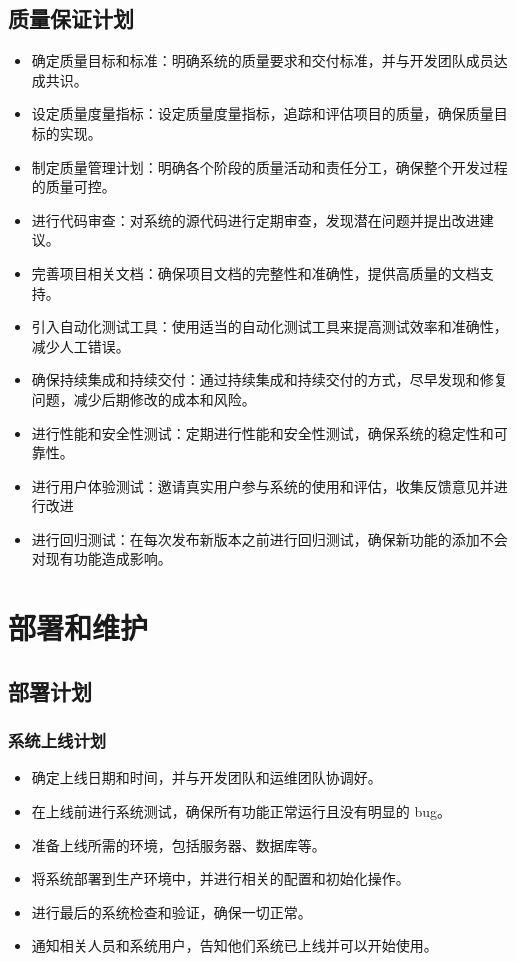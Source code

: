 \documentclass{article}
\begin{document}
\subsection{质量保证计划}
\begin{itemize}
	\item 确定质量目标和标准：明确系统的质量要求和交付标准，并与开发团队成员达成共识。
	\item 设定质量度量指标：设定质量度量指标，追踪和评估项目的质量，确保质量目标的实现。
	\item 制定质量管理计划：明确各个阶段的质量活动和责任分工，确保整个开发过程的质量可控。
	\item 进行代码审查：对系统的源代码进行定期审查，发现潜在问题并提出改进建议。
	\item 完善项目相关文档：确保项目文档的完整性和准确性，提供高质量的文档支持。
	\item 引入自动化测试工具：使用适当的自动化测试工具来提高测试效率和准确性，减少人工错误。
	\item 确保持续集成和持续交付：通过持续集成和持续交付的方式，尽早发现和修复问题，减少后期修改的成本和风险。
	\item 进行性能和安全性测试：定期进行性能和安全性测试，确保系统的稳定性和可靠性。
	\item 进行用户体验测试：邀请真实用户参与系统的使用和评估，收集反馈意见并进行改进
	\item 进行回归测试：在每次发布新版本之前进行回归测试，确保新功能的添加不会对现有功能造成影响。
\end{itemize}


\section{部署和维护}
\subsection{部署计划}
\subsubsection{系统上线计划}
\begin{itemize}
	\item 确定上线日期和时间，并与开发团队和运维团队协调好。
	\item 在上线前进行系统测试，确保所有功能正常运行且没有明显的 bug。
	\item 准备上线所需的环境，包括服务器、数据库等。
	\item 将系统部署到生产环境中，并进行相关的配置和初始化操作。
	\item 进行最后的系统检查和验证，确保一切正常。
	\item 通知相关人员和系统用户，告知他们系统已上线并可以开始使用。
\end{itemize}
\end{document}
